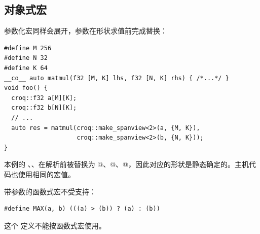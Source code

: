 \subsection*{对象式宏}

参数化宏同样会展开，参数在形状求值前完成替换：

\begin{lstlisting}[language=croqtile,caption={对象式宏}]
#define M 256
#define N 32
#define K 64
__co__ auto matmul(f32 [M, K] lhs, f32 [N, K] rhs) { /*...*/ }
void foo() {
  croq::f32 a[M][K];
  croq::f32 b[N][K];
  // ...
  auto res = matmul(croq::make_spanview<2>(a, {M, K}),
                    croq::make_spanview<2>(b, {N, K}));
}
\end{lstlisting}

本例的 \co@M@、\co@N@、\co@K@ 在解析前被替换为 @、@、@，因此对应的形状是静态确定的。主机代码也使用相同的宏值。

带参数的函数式宏不受支持：

\begin{lstlisting}[language=croqtile,caption={带参数的宏}]
#define MAX(a, b) (((a) > (b)) ? (a) : (b))
\end{lstlisting}

这个 \co@MAX@ 定义不能按函数式宏使用。
